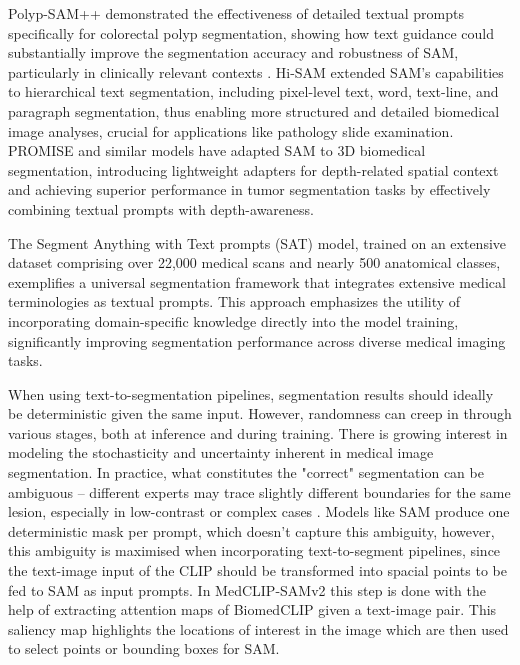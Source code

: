 \documentclass[./dissertation.tex]{subfiles}
\begin{document}
Polyp-SAM++ \cite{biswas2023polyp} demonstrated the effectiveness of detailed textual prompts specifically for colorectal polyp segmentation, showing how text guidance could substantially improve the segmentation accuracy and robustness of SAM, particularly in clinically relevant contexts . Hi-SAM \cite{ye2024hi} extended SAM's capabilities to hierarchical text segmentation, including pixel-level text, word, text-line, and paragraph segmentation, thus enabling more structured and detailed biomedical image analyses, crucial for applications like pathology slide examination. PROMISE \cite{li2024promise} and similar models have adapted SAM to 3D biomedical segmentation, introducing lightweight adapters for depth-related spatial context and achieving superior performance in tumor segmentation tasks by effectively combining textual prompts with depth-awareness.

The Segment Anything with Text prompts (SAT) \cite{zhao2023one} model, trained on an extensive dataset comprising over 22,000 medical scans and nearly 500 anatomical classes, exemplifies a universal segmentation framework that integrates extensive medical terminologies as textual prompts. This approach emphasizes the utility of incorporating domain-specific knowledge directly into the model training, significantly improving segmentation performance across diverse medical imaging tasks.

When using text-to-segmentation pipelines, segmentation results should ideally be deterministic given the same input. However, randomness can creep in through various stages, both at inference and during training. There is growing interest in modeling the stochasticity and uncertainty inherent in medical image segmentation. In practice, what constitutes the "correct" segmentation can be ambiguous – different experts may trace slightly different boundaries for the same lesion, especially in low-contrast or complex cases \cite{rakic2024tyche}. Models like SAM produce one deterministic mask per prompt, which doesn't capture this ambiguity, however, this ambiguity is maximised when incorporating text-to-segment pipelines, since the text-image input of the CLIP should be transformed into spacial points to be fed to SAM as input prompts. In MedCLIP-SAMv2 \cite{koleilat2024medclip} this step is done with the help of extracting attention maps of BiomedCLIP given a text-image pair. This saliency map highlights the locations of interest in the image which are then used to select points or bounding boxes for SAM.
\end{document}
